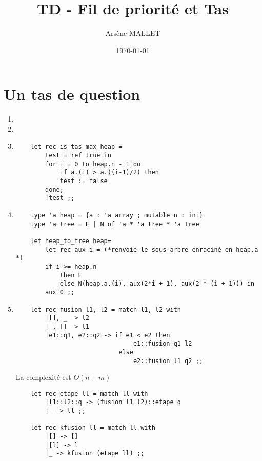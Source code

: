 \documentclass{article}
\title{TD - Fil de priorité et Tas}
\date{\today}
\author{Arsène MALLET}
\newcommand{\image}[3]{ %
    \begin{minipage}[t]{\linewidth}
        #1
              \adjustbox{valign=t}{%
                \texttt{[image: \#3]}%
              }
    \end{minipage}}
\begin{document}
\thispagestyle{firstpage}

\begin{center}
    \huge\bfseries{\@title}
\end{center}

\section{Un tas de question}

\begin{enumerate}

\item \image{\raggedright}{0.6}{img/I_1.pdf}

\item

\item \begin{verbatim}
    let rec is_tas_max heap = 
        test = ref true in
        for i = 0 to heap.n - 1 do
            if a.(i) > a.((i-1)/2) then
            test := false
        done;
        !test ;;
\end{verbatim}

\item \begin{verbatim}
    type 'a heap = {a : 'a array ; mutable n : int}
    type 'a tree = E | N of 'a * 'a tree * 'a tree

    let heap_to_tree heap=
        let rec aux i = (*renvoie le sous-arbre enraciné en heap.a *)
        if i >= heap.n
            then E
            else N(heap.a.(i), aux(2*i + 1), aux(2 * (i + 1))) in
        aux 0 ;;
\end{verbatim}


\item \begin{verbatim}
    let rec fusion l1, l2 = match l1, l2 with
        |[], _ -> l2
        |_, [] -> l1
        |e1::q1, e2::q2 -> if e1 < e2 then
                                e1::fusion q1 l2
                            else
                                e2::fusion l1 q2 ;;
\end{verbatim}

La complexité est $O(n+m)$

\image{\centering}{0.8}{img/I_5.pdf}

\begin{verbatim}
    let rec etape ll = match ll with
        |l1::l2::q -> (fusion l1 l2)::etape q
        |_ -> ll ;;

    let rec kfusion ll = match ll with
        |[] -> []
        |[l] -> l
        |_ -> kfusion (etape ll) ;;
\end{verbatim}

\end{enumerate}
\end{document}
